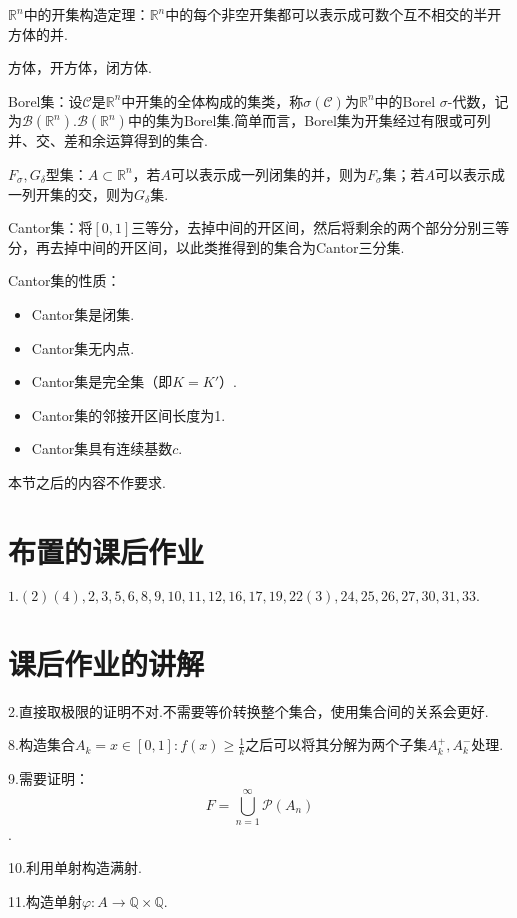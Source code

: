 \documentclass[bwprint, withoutpreface]{cumcmthesis}
\begin{document}
$\mathbb{R}^n$中的开集构造定理：$\mathbb{R}^n$中的每个非空开集都可以表示成可数个互不相交的半开方体的并.

方体，开方体，闭方体.

Borel集：设$\mathcal{C}$是$\mathbb{R}^n$中开集的全体构成的集类，称$\sigma(\mathcal{C})$为$\mathbb{R}^n$中的Borel $\sigma$-代数，记为$\mathcal{B}(\mathbb{R}^n)$.$\mathcal{B}(\mathbb{R}^n)$中的集为Borel集.简单而言，Borel集为开集经过有限或可列并、交、差和余运算得到的集合.

$F_{\sigma},G_{\delta}$型集：$A \subset \mathbb{R}^n$，若$A$可以表示成一列闭集的并，则为$F_{\sigma}$集；若$A$可以表示成一列开集的交，则为$G_{\delta}$集.

Cantor集：将$[0, 1]$三等分，去掉中间的开区间，然后将剩余的两个部分分别三等分，再去掉中间的开区间，以此类推得到的集合为Cantor三分集.

Cantor集的性质：
\begin{itemize}[itemindent=2em]
	\item Cantor集是闭集.
	\item Cantor集无内点.
	\item Cantor集是完全集（即$K=K'$）.
	\item Cantor集的邻接开区间长度为1.
	\item Cantor集具有连续基数$c$.
\end{itemize}

本节之后的内容不作要求.

\appendix
\section{布置的课后作业}
\indent $1.(2)(4),2,3,5,6,8,9,10,11,12,16,17,19,22(3),24,25,26,27,30,31,33.$

\section{课后作业的讲解}
\indent 2.直接取极限的证明不对.不需要等价转换整个集合，使用集合间的关系会更好.

8.构造集合$A_k = {x \in [0, 1]: f(x) \geqslant \frac{1}{k}}$之后可以将其分解为两个子集$A_k^{+},A_k^{-}$处理.

9.需要证明：
\begin{equation*}
	F = \bigcup_{n = 1}^{\infty}{\mathcal{P}(A_n)}
\end{equation*}.

10.利用单射构造满射.

11.构造单射$\varphi: A \to \mathbb{Q} \times \mathbb{Q}$.
\end{document}
